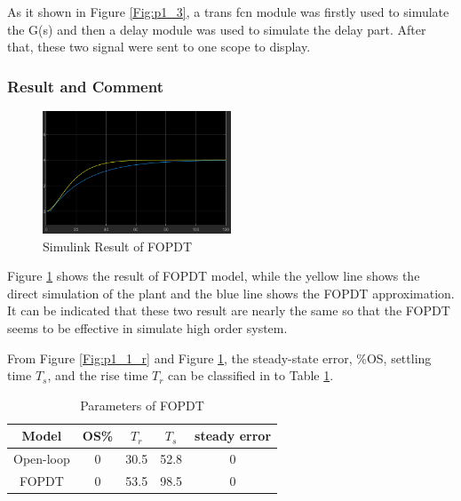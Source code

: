 \documentclass[11pt, a4paper]{article}
\begin{document}
As it shown in Figure \ref{Fig:p1_3}, a trans fcn module was firstly used to simulate the G(s) and then a delay module was used to simulate the delay part. After that, these two signal were sent to one scope to display.


\subsubsection{Result and Comment}

\begin{figure}[htbp]     \begin{centering}
    \includegraphics[width=0.5\textwidth]{p1_3_r.png}
    \caption{\label{Fig:p1_3_r}Simulink Result of FOPDT}
    \end{centering}
    
\end{figure}

Figure \ref{Fig:p1_3_r} shows the result of FOPDT model, while the yellow line shows the direct simulation of the plant and the blue line shows the FOPDT approximation. It can be indicated that these two result are nearly the same so that the FOPDT seems to be effective in simulate high order system.

From Figure \ref{Fig:p1_1_r} and Figure \ref{Fig:p1_3_r}, the steady-state error, \%OS, settling time $T_{s}$, and the rise time $T_{r}$ can be classified in to Table \ref{tab:resp_1}.

\begin{table}[htbp]
\caption{Parameters of FOPDT}
\label{tab:resp_1}
\begin{center}
\begin{tabular}{c||cccc}
\hline
 Model   &    OS\%      & $T_{r}$       & $T_{s}$   &  steady error \\
\hline
Open-loop  &   0         & 30.5          &  52.8     &  0     \\
FOPDT  &   0         & 53.5          &  98.5     &  0     \\
\hline
\end{tabular}
\end{center}
\end{table}
\end{document}
